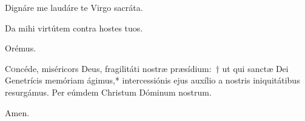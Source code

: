 \noindent \vv Dignáre me laudáre te Virgo sacráta.

\noindent \rr Da mihi virtútem contra hostes tuos.

Orémus.

\noindent \lettrine{C}{o}ncéde, miséricors Deus, fragilitáti nostræ præsídium:~† ut qui sanctæ Dei Genetrícis memóriam ágimus,* intercessiónis ejus auxílio a nostris iniquitátibus resurgámus. Per eúmdem Christum Dóminum nostrum.

\rr Amen.